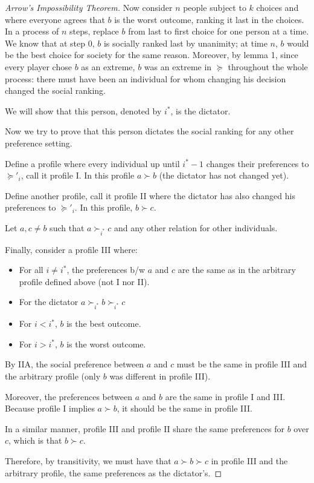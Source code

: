 \documentclass[12pt]{report}
\begin{document}
\begin{proof}[Arrow's Impossibility Theorem]
Now consider $n$ people subject to $k$ choices and where everyone agrees that $b$ is the worst outcome, ranking it last in the choices. In a process of $n$ steps, replace $b$ from last to first choice for one person at a time. We know that at step 0, $b$ is socially ranked last by unanimity; at time $n$, $b$ would be the best choice for society for the same reason. Moreover, by lemma 1, since every player chose $b$ as an extreme, $b$ was an extreme in $\succeq$ throughout the whole process: there must have been an individual for whom changing his decision changed the social ranking. 

We will show that this person, denoted by $i^*$, is the dictator.

Now we try to prove that this person dictates the social ranking for any other preference setting.

Define a profile where every individual up until $i^* -1$ changes their preferences to $\succeq'_i$, call it profile I. In this profile $a\succ b$ (the dictator has not changed yet).

Define another profile, call it profile II where the dictator has also changed his preferences to $\succeq'_i$. In this profile, $b\succ c$.

Let $a,c\neq b$ such that $a \succ_{i^*} c$ and any other relation for other individuals. 

Finally, consider a profile III where:\begin{itemize}
\item For all $i\neq i^*$, the preferences b/w $a$ and $c$ are the same as in the arbitrary profile defined above (not I nor II).
\item For the dictator $a \succ_{i^*} b \succ_{i^*} c$
\item For $i<i^*$, $b$ is the best outcome.
\item For $i>i^*$, $b$ is the worst outcome.
\end{itemize}

By IIA, the social preference between $a$ and $c$ must be the same in profile III and the arbitrary profile (only $b$ was different in profile III).

Moreover, the preferences between $a$ and $b$ are the same in profile I and III. Because profile I implies $a\succ b$, it should be the same in profile III.

In a similar manner, profile III and profile II share the same preferences for $b$ over $c$, which is that $b\succ c$.

Therefore, by transitivity, we must have that $a\succ b\succ c$ in profile III and the arbitrary profile, the same preferences as the dictator's.
\end{proof}
\end{document}
